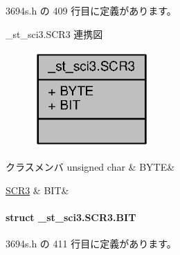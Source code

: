  3694s.\+h の 409 行目に定義があります。



\+\_\+st\+\_\+sci3.\+S\+C\+R3 連携図
\nopagebreak
\begin{figure}[H]
\begin{center}
\leavevmode
\includegraphics[width=127pt]{d1/d92/union__st__sci3_8SCR3__coll__graph}
\end{center}
\end{figure}
\begin{DoxyFields}{クラスメンバ}
unsigned char\label{3694s_8h_ae409eb2ba6eb6801f52763ae370c350e}
&
B\+Y\+T\+E&
\\
\hline

\hyperlink{3694s_8h_d7/d31/struct__st__sci3_8SCR3_8BIT}{S\+C\+R3}\label{3694s_8h_adb957fdc8000e1eef04a243f5199aa52}
&
B\+I\+T&
\\
\hline

\end{DoxyFields}
\label{struct__st__sci3_8SCR3_8BIT}
\paragraph{struct \+\_\+st\+\_\+sci3.\+S\+C\+R3.\+B\+I\+T}


 3694s.\+h の 411 行目に定義があります。



